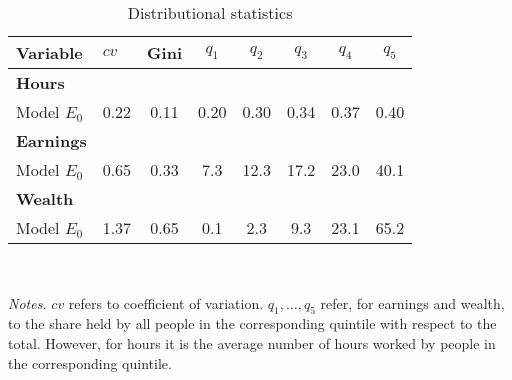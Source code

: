 \begin{table}[!htbp]
\centering
\caption{Distributional statistics}
\begin{tabular}{llcccccc}
\toprule
Variable & $cv$ & Gini & $q_1$ & $q_2$ & $q_3$ & $q_4$ & $q_5$ \\
\midrule
\textbf{Hours} &   &  &   &  &  &  &  \\
Model $E_0$ & 0.22 & 0.11 & 0.20 & 0.30 & 0.34 & 0.37 & 0.40 \\
\addlinespace
\textbf{Earnings} &   &  &   &  &  &  &  \\
Model $E_0$ & 0.65 & 0.33 & 7.3 & 12.3 & 17.2 & 23.0 & 40.1 \\
\addlinespace
\textbf{Wealth} &   &  &   &  &  &  &  \\
Model $E_0$ & 1.37 & 0.65 & 0.1 & 2.3 & 9.3 & 23.1 & 65.2 \\
\bottomrule
\end{tabular}
\\[3ex]
\raggedright\footnotesize{\textit{Notes.} $cv$ refers to coefficient of variation. $q_1, \dots, q_5$ refer, for earnings and wealth, to the share held by all people in the corresponding quintile with respect to the total. However, for hours it is the average number of hours worked by people in the corresponding quintile.}\\
\normalsize
\end{table}
